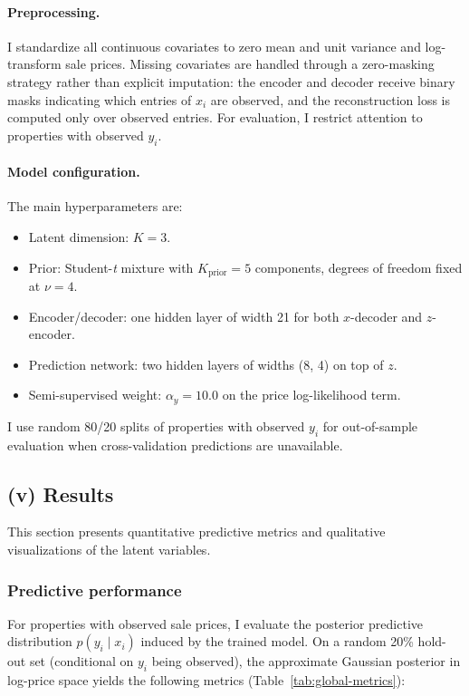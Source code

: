 \documentclass[11pt]{article}
\begin{document}
\paragraph{Preprocessing.} I standardize all continuous covariates to zero mean and unit variance and log-transform sale prices. Missing covariates are handled through a zero-masking strategy rather than explicit imputation: the encoder and decoder receive binary masks indicating which entries of $x_i$ are observed, and the reconstruction loss is computed only over observed entries. For evaluation, I restrict attention to properties with observed $y_i$.

\paragraph{Model configuration.} The main hyperparameters are:
\begin{itemize}[noitemsep]
    \item Latent dimension: $K = 3$.
    \item Prior: Student-\emph{t} mixture with $K_{\text{prior}} = 5$ components, degrees of freedom fixed at $\nu = 4$.
    \item Encoder/decoder: one hidden layer of width 21 for both $x$-decoder and $z$-encoder.
    \item Prediction network: two hidden layers of widths (8, 4) on top of $z$.
    \item Semi-supervised weight: $\alpha_y = 10.0$ on the price log-likelihood term.
\end{itemize}

I use random 80/20 splits of properties with observed $y_i$ for out-of-sample evaluation when cross-validation predictions are unavailable.

\subsection*{(v) Results}

This section presents quantitative predictive metrics and qualitative visualizations of the latent variables.

\subsubsection*{Predictive performance}

For properties with observed sale prices, I evaluate the posterior predictive distribution $p(y_i \mid x_i)$ induced by the trained model. On a random 20\% hold-out set (conditional on $y_i$ being observed), the approximate Gaussian posterior in log-price space yields the following metrics (Table~\ref{tab:global-metrics}):
\end{document}
